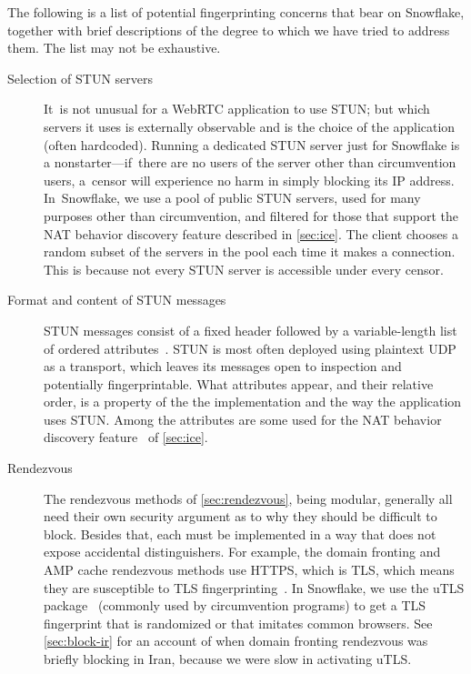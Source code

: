 \documentclass[letterpaper,twocolumn]{article}
\begin{document}
The following is a list of potential fingerprinting concerns
that bear on Snowflake, together with brief descriptions
of the degree to which we have tried to address them.
The list may not be exhaustive.

\begin{description}
\item[Selection of STUN servers]
It~is not unusual for a WebRTC application to use STUN;
but which servers it uses is externally observable
and is the choice of the application (often hardcoded).
Running a dedicated STUN server just for Snowflake is a nonstarter---if~there
are no users of the server other than circumvention users,
a~censor will experience no harm in simply blocking its IP address.
In~Snowflake, we use a pool of public STUN servers,
used for many purposes other than circumvention,
and filtered for those that support the NAT behavior discovery feature
described in \autoref{sec:ice}.
The client chooses a random subset of the servers in the pool
each time it makes a connection.
This is because not every STUN server is accessible
under every censor.

\item[Format and content of STUN messages]
STUN messages consist of a fixed header
followed by a variable-length list of ordered
attributes~\cite[\S 5]{rfc8489}.
STUN is most often deployed using plaintext UDP as a transport,
which leaves its messages open to inspection
and potentially fingerprintable.
What attributes appear,
and their relative order,
is a property of the the implementation
and the way the application uses STUN.
Among the attributes are some used
for the NAT behavior discovery feature~\cite[\S 7]{rfc5780}
of \autoref{sec:ice}.


\item[Rendezvous]
The rendezvous methods of
\autoref{sec:rendezvous},
being modular,
generally all need their own security argument
as to why they should be difficult to block.
Besides that, each must be implemented in a way
that does not expose accidental distinguishers.
For example, the domain fronting and AMP cache rendezvous methods
use HTTPS, which is TLS, which means they are susceptible to TLS fingerprinting~\cite[\S 5.1]{Fifield2015a}.
In Snowflake, we use the uTLS package~\cite[\S VII]{Frolov2019a}
(commonly used by circumvention programs)
to get a TLS fingerprint that is randomized or that imitates common browsers.
See \autoref{sec:block-ir} for an account of when
domain fronting rendezvous was briefly blocking in Iran,
because we were slow in activating uTLS.


\end{description}
\end{document}
